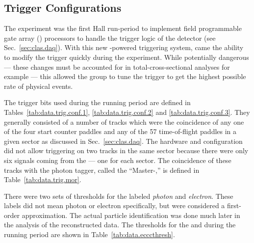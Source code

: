 \subsection{\label{sec:summary.trigger}Trigger Configurations}

The  experiment was the first Hall  run-period to implement field programmable gate array () processors to handle the trigger logic of the  detector (see Sec.~\ref{sec:clas.daq}). With this new -powered triggering system, came the ability to modify the trigger quickly during the experiment. While potentially dangerous --- these changes must be accounted for in total-cross-sectional analyses for example --- this allowed the group to tune the trigger to get the highest possible rate of physical events.

The trigger bits used during the  running period are defined in Tables~\ref{tab:data.trig.conf.1}, \ref{tab:data.trig.conf.2} and \ref{tab:data.trig.conf.3}. They generally consisted of a number of tracks which were the coincidence of any one of the four start counter paddles and any of the 57 time-of-flight paddles in a given sector as discussed in Sec.~\ref{sec:clas.daq}. The hardware and configuration did not allow triggering on two tracks in the same sector because there were only six signals coming from the  --- one for each sector. The coincidence of these tracks with the photon tagger, called the ``Master-,'' is defined in Table~\ref{tab:data.trig.mor}.





There were two sets of thresholds for the  labeled \emph{photon} and \emph{electron}. These labels did not mean photon or electron specifically, but were considered a first-order approximation. The actual particle identification was done much later in the analysis of the reconstructed data. The thresholds for the  and  during the  running period are shown in Table~\ref{tab:data.ecccthresh}.


\FloatBarrier
